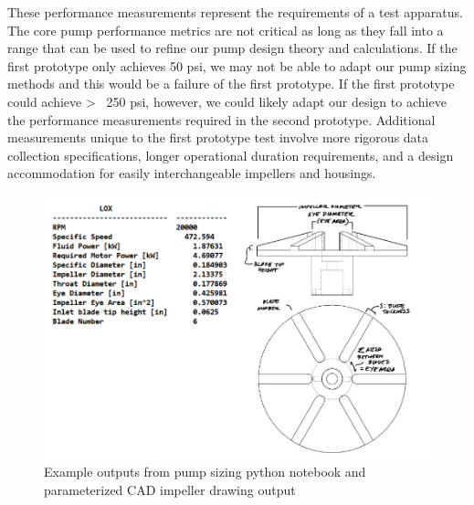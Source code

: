 \documentclass[11pt,twoside,a4paper,openright]{report}
\begin{document}
	These performance measurements represent the requirements of a test apparatus. The core pump performance metrics are not critical as long as they fall into a range that can be used to refine our pump design theory and calculations. If the first prototype only achieves 50 psi, we may not be able to adapt our pump sizing methods and this would be a failure of the first prototype. If the first prototype could achieve > ~250 psi, however, we could likely adapt our design to achieve the performance measurements required in the second prototype. Additional measurements unique to the first prototype test involve more rigorous data collection specifications, longer operational duration requirements, and a design accommodation for  easily interchangeable impellers and housings.\par
	



\begin{figure}[!h]
\includegraphics[width=\textwidth]{example_pump.png}
\caption{Example outputs from pump sizing python notebook and parameterized CAD impeller drawing output
}
\end{figure}



\newpage
{}
\newpage

\newpage
\end{document}
